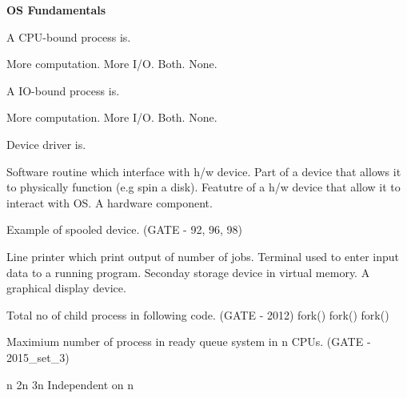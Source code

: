 
\centerline{\textbf{ \LARGE OS Fundamentals}}

\setcounter{question}{0}

\question A CPU-bound process is.

\begin{oneparchoices}
   \choice More computation.
   \choice More I/O.
   \choice Both.
   \choice None.
\end{oneparchoices}


\question A IO-bound process is.

\begin{oneparchoices}
   \choice More computation.
   \choice More I/O.
   \choice Both.
   \choice None.
\end{oneparchoices}


\question Device driver is.

  \begin{choices}
    \choice Software routine which interface with h/w device.
    \choice Part of a device that allows it to physically function (e.g spin a disk).
    \choice Featutre of a h/w device that allow it to interact with OS.
    \choice A hardware component.
  \end{choices}

  \question Example of spooled device. (GATE - 92, 96, 98)

  \begin{choices}
    \choice Line printer which print output of number of jobs.
    \choice Terminal used to enter input data to a running program.
    \choice Seconday storage device in virtual memory.
    \choice A graphical display device.
  \end{choices}

  \question  Total no of child process in following code. (GATE - 2012) \newline
    fork()  \newline fork()  \newline  fork()

  \begin{oneparchoices}
  \end{oneparchoices}

  \question Maximium number of process in ready queue system in n CPUs. (GATE - 2015\_set\_3)

  \begin{oneparchoices}
    \choice n
    \choice 2n
    \choice 3n
    \choice Independent on n
  \end{oneparchoices}


